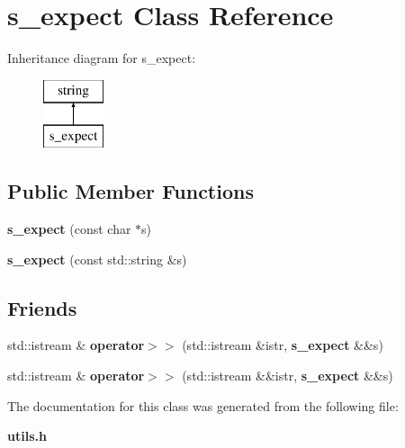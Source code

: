 \section{s\+\_\+expect Class Reference}
\label{classs__expect}
Inheritance diagram for s\+\_\+expect\+:\begin{figure}[H]
\begin{center}
\leavevmode
\includegraphics[height=2.000000cm]{classs__expect}
\end{center}
\end{figure}
\subsection*{Public Member Functions}
\begin{DoxyCompactItemize}
\item 
\mbox{\label{classs__expect_ac20ef1b22d7cbc72ddbe05cc7abfae92}} 
{\bfseries s\+\_\+expect} (const char $\ast$s)
\item 
\mbox{\label{classs__expect_aca6975249f49e68073d53a6d840f58e7}} 
{\bfseries s\+\_\+expect} (const std\+::string \&s)
\end{DoxyCompactItemize}
\subsection*{Friends}
\begin{DoxyCompactItemize}
\item 
\mbox{\label{classs__expect_a4e0badbf124b3afd55ab2f134555d00e}} 
std\+::istream \& {\bfseries operator$>$$>$} (std\+::istream \&istr, \textbf{ s\+\_\+expect} \&\&s)
\item 
\mbox{\label{classs__expect_a3fdcbe10442082a6e476d40576a80994}} 
std\+::istream \& {\bfseries operator$>$$>$} (std\+::istream \&\&istr, \textbf{ s\+\_\+expect} \&\&s)
\end{DoxyCompactItemize}


The documentation for this class was generated from the following file\+:\begin{DoxyCompactItemize}
\item 
\textbf{ utils.\+h}\end{DoxyCompactItemize}

